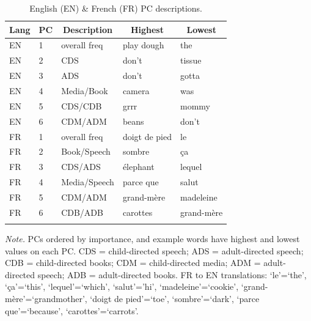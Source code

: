 \documentclass[10pt, letterpaper]{article}
\newenvironment{CodeChunk}{}{}
\begin{document}
\begin{CodeChunk}



\begin{table}[tbp]

\begin{center}
\begin{threeparttable}

\caption{\label{tab:table3}English (EN) \& French (FR) PC descriptions.}

\begin{tabular}{lllll}
\toprule
Lang & \multicolumn{1}{c}{PC} & \multicolumn{1}{c}{Description} & \multicolumn{1}{c}{Highest} & \multicolumn{1}{c}{Lowest}\\
\midrule
EN & 1 & overall freq & play dough & the\\
EN & 2 & CDS & don't & tissue\\
EN & 3 & ADS & don't & gotta\\
EN & 4 & Media/Book & camera & was\\
EN & 5 & CDS/CDB & grrr & mommy\\
EN & 6 & CDM/ADM & beans & don't\\
FR & 1 & overall freq & doigt de pied & le\\
FR & 2 & Book/Speech & sombre & ça\\
FR & 3 & CDS/ADS & élephant & lequel\\
FR & 4 & Media/Speech & parce que & salut\\
FR & 5 & CDM/ADM & grand-mère & madeleine\\
FR & 6 & CDB/ADB & carottes & grand-mère\\
\bottomrule
\addlinespace
\end{tabular}

\begin{tablenotes}[para]
\normalsize{\textit{Note.} PCs ordered by importance, and example words have highest and lowest values on each PC. CDS = child-directed speech; ADS = adult-directed speech; CDB = child-directed books; CDM = child-directed media; ADM = adult-directed speech; ADB = adult-directed books. FR to EN translations: `le'=`the', `ça'=`this', `lequel'=`which', `salut'='hi', `madeleine'=`cookie', `grand-mère'=`grandmother', `doigt de pied'=`toe', `sombre'=`dark', `parce que'=`because', `carottes'=`carrots'.}
\end{tablenotes}

\end{threeparttable}
\end{center}

\end{table}


\end{CodeChunk}
\end{document}
